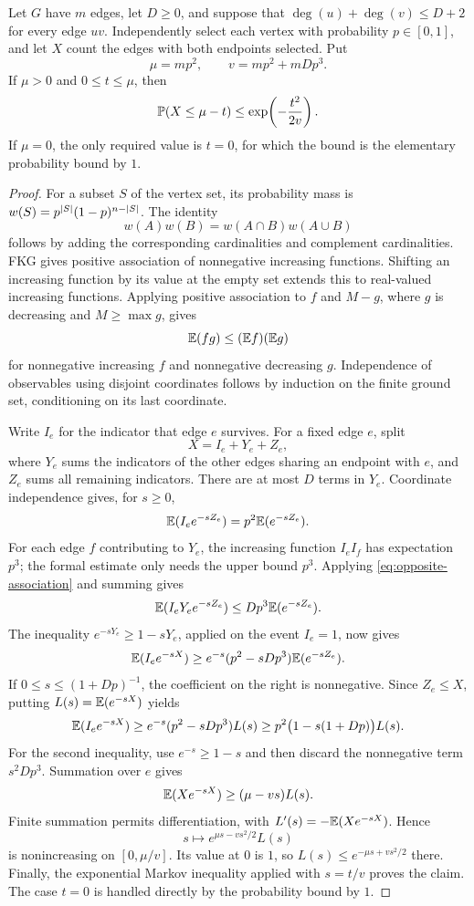 \begin{lemma}\label{lem:sampling-input}
Let $G$ have $m$ edges, let $D\ge0$, and suppose that
$\deg(u)+\deg(v)\le D+2$ for every edge $uv$.
Independently select each vertex with probability $p\in[0,1]$, and let $X$
count the edges with both endpoints selected. Put
\[
                       \mu=mp^2,\qquad v=mp^2+mDp^3.
\]
If $\mu>0$ and $0\le t\le\mu$, then
\[
                    \mathbb P(X\le\mu-t)\le
                    \exp\!\left(-\frac{t^2}{2v}\right).
\]
If $\mu=0$, the only required value is $t=0$, for which the bound is the
elementary probability bound by $1$.
\end{lemma}
\begin{proof}
For a subset $S$ of the vertex set, its probability mass is
$w(S)=p^{\left|S\right|}(1-p)^{n-\left|S\right|}$. The identity
\[
                     w(A)w(B)=w(A\cap B)w(A\cup B)
\]
follows by adding the corresponding cardinalities and complement
cardinalities. FKG gives positive association of nonnegative increasing
functions. Shifting an increasing function by its value at the empty set
extends this to real-valued increasing functions. Applying positive
association to $f$ and $M-g$, where $g$ is decreasing and $M\ge\max g$,
gives
\begin{equation}\label{eq:opposite-association}
                 \mathbb E(fg)\le (\mathbb E f)(\mathbb E g)
\end{equation}
for nonnegative increasing $f$ and nonnegative decreasing $g$.
Independence of observables using disjoint coordinates follows by
induction on the finite ground set, conditioning on its last coordinate.

Write $I_e$ for the indicator that edge $e$ survives. For a fixed edge
$e$, split
\[
                         X=I_e+Y_e+Z_e,
\]
where $Y_e$ sums the indicators of the other edges sharing an endpoint
with $e$, and $Z_e$ sums all remaining indicators. There are at most $D$
terms in $Y_e$. Coordinate independence gives, for $s\ge0$,
\[
                  \mathbb E(I_e e^{-sZ_e})=p^2\mathbb E(e^{-sZ_e}).
\]
For each edge $f$ contributing to $Y_e$, the increasing function $I_eI_f$
has expectation $p^3$; the formal estimate only needs the upper bound
$p^3$. Applying \eqref{eq:opposite-association} and summing gives
\[
                  \mathbb E(I_eY_e e^{-sZ_e})\le Dp^3\mathbb E(e^{-sZ_e}).
\]
The inequality $e^{-sY_e}\ge1-sY_e$, applied on the event $I_e=1$, now gives
\[
 \mathbb E(I_e e^{-sX})\ge e^{-s}(p^2-sDp^3)\mathbb E(e^{-sZ_e}).
\]
If $0\le s\le(1+Dp)^{-1}$, the coefficient on the right is nonnegative.
Since $Z_e\le X$, putting $L(s)=\mathbb E(e^{-sX})$ yields
\[
 \mathbb E(I_e e^{-sX})\ge e^{-s}(p^2-sDp^3)L(s)
                    \ge p^2\bigl(1-s(1+Dp)\bigr)L(s).
\]
For the second inequality, use $e^{-s}\ge1-s$ and then discard the
nonnegative term $s^2Dp^3$. Summation over $e$ gives
\[
                        \mathbb E(Xe^{-sX})\ge(\mu-vs)L(s).
\]
Finite summation permits differentiation, with
$L'(s)=-\mathbb E(Xe^{-sX})$. Hence
\[
                 s\longmapsto e^{\mu s-vs^2/2}L(s)
\]
is nonincreasing on $[0,\mu/v]$. Its value at $0$ is $1$, so
$L(s)\le e^{-\mu s+vs^2/2}$ there. Finally, the exponential Markov
inequality applied with $s=t/v$ proves the claim. The case $t=0$ is
handled directly by the probability bound by $1$.
\end{proof}

